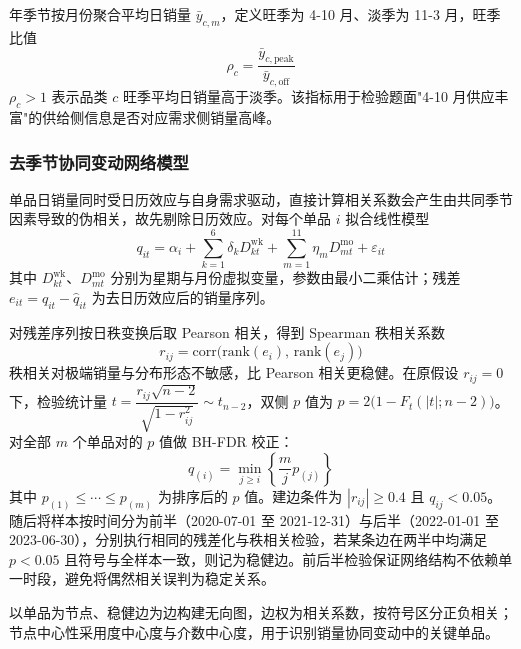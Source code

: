 年季节按月份聚合平均日销量 $\bar y_{c,m}$，定义旺季为 4-10 月、淡季为 11-3 月，旺季比值
\begin{equation}\label{eq:rho}
  \rho_c=\frac{\bar y_{c,\mathrm{peak}}}{\bar y_{c,\mathrm{off}}}
\end{equation}
$\rho_c>1$ 表示品类 $c$ 旺季平均日销量高于淡季。该指标用于检验题面"4-10 月供应丰富"的供给侧信息是否对应需求侧销量高峰。

\subsubsection{去季节协同变动网络模型}

单品日销量同时受日历效应与自身需求驱动，直接计算相关系数会产生由共同季节因素导致的伪相关\cite{yule1926,granger1974}，故先剔除日历效应。对每个单品 $i$ 拟合线性模型\cite{wooldridge2010}
\begin{equation}\label{eq:reg}
  q_{it}=\alpha_i+\sum_{k=1}^{6}\delta_k D^{\mathrm{wk}}_{kt}
  +\sum_{m=1}^{11}\eta_m D^{\mathrm{mo}}_{mt}+\varepsilon_{it}
\end{equation}
其中 $D^{\mathrm{wk}}_{kt}$、$D^{\mathrm{mo}}_{mt}$ 分别为星期与月份虚拟变量，参数由最小二乘估计；残差 $e_{it}=q_{it}-\hat q_{it}$ 为去日历效应后的销量序列。

对残差序列按日秩变换后取 Pearson 相关，得到 Spearman 秩相关系数\cite{spearman1904}
\begin{equation}\label{eq:spearman}
  r_{ij}=\mathrm{corr}\big(\mathrm{rank}(e_i),\,\mathrm{rank}(e_j)\big)
\end{equation}
秩相关对极端销量与分布形态不敏感，比 Pearson 相关更稳健。在原假设 $r_{ij}=0$ 下，检验统计量 $t=\dfrac{r_{ij}\sqrt{n-2}}{\sqrt{1-r_{ij}^2}}\sim t_{n-2}$，双侧 $p$ 值为 $p=2\big(1-F_t(|t|;n-2)\big)$。对全部 $m$ 个单品对的 $p$ 值做 BH-FDR 校正\cite{benjamini1995}：
\begin{equation}\label{eq:fdr}
  q_{(i)}=\min_{j\ge i}\left\{\frac{m}{j}p_{(j)}\right\}
\end{equation}
其中 $p_{(1)}\le\cdots\le p_{(m)}$ 为排序后的 $p$ 值。建边条件为 $|r_{ij}|\ge0.4$ 且 $q_{ij}<0.05$。随后将样本按时间分为前半（2020-07-01 至 2021-12-31）与后半（2022-01-01 至 2023-06-30），分别执行相同的残差化与秩相关检验，若某条边在两半中均满足 $p<0.05$ 且符号与全样本一致，则记为稳健边。前后半检验保证网络结构不依赖单一时段，避免将偶然相关误判为稳定关系。

以单品为节点、稳健边为边构建无向图\cite{tumminello2005,mantegna1999}，边权为相关系数，按符号区分正负相关；节点中心性采用度中心度与介数中心度\cite{freeman1977,wasserman1994}，用于识别销量协同变动中的关键单品。

